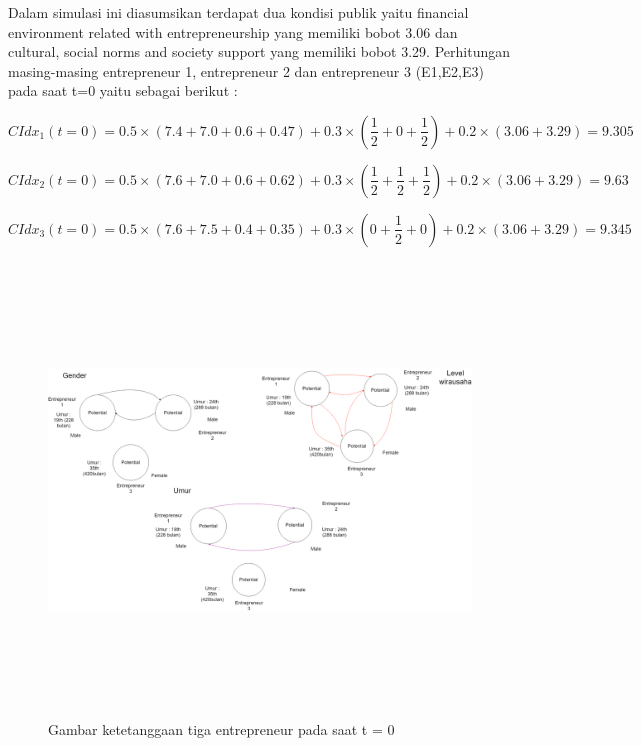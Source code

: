 Dalam simulasi ini diasumsikan terdapat dua kondisi publik yaitu financial environment related with entrepreneurship yang memiliki bobot 3.06 dan cultural, social norms and society support yang memiliki bobot 3.29. Perhitungan masing-masing entrepreneur 1, entrepreneur 2 dan entrepreneur 3 (E1,E2,E3) pada saat t=0 yaitu sebagai berikut :
	

\begin{equation}
	CIdx_{1}(t=0) = 0.5 \times (7.4 + 7.0 + 0.6 + 0.47) + 0.3 \times (\frac {1} {2} + 0 +  \frac {1} {2}) + 0.2 \times (3.06 + 3.29) = 9.305
\end{equation}	

\begin{equation}
	CIdx_{2}(t=0) = 0.5 \times (7.6 + 7.0 + 0.6 + 0.62) + 0.3 \times (\frac {1} {2} + \frac {1} {2} + \frac {1} {2}) + 0.2 \times (3.06 + 3.29) = 9.63
\end{equation}

\begin{equation}
	CIdx_{3}(t=0) = 0.5 \times (7.6 + 7.5 + 0.4 + 0.35) + 0.3 \times (0 + \frac {1} {2} + 0) + 0.2 \times (3.06 + 3.29) = 9.345
\end{equation}

	\begin{figure} [H]
		\centering  
		\includegraphics[width=18cm, height=12cm]{gambarwirausaha(t=0)} 
		\caption[Gambar ketetanggaan tiga entrepreneur pada saat t = 0]{Gambar ketetanggaan tiga entrepreneur pada saat t = 0} 
		\label{fig:t0} 
	\end{figure}

